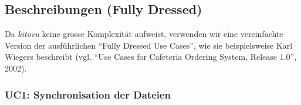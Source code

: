 \documentclass[a4paper]{article}
\begin{document}
\pagebreak
\subsection{Beschreibungen (Fully Dressed)}

Da \emph{kitovu} keine grosse Komplexität aufweist, verwenden wir eine vereinfachte Version der ausführ\-lichen ``Fully Dressed Use Cases'', wie sie beispielsweise Karl Wiegers beschreibt (vgl. ``Use Cases for Cafeteria Ordering System, Release 1.0'', 2002).


\subsubsection{UC1: Synchronisation der Dateien}
\end{document}
